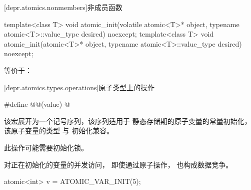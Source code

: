 [depr.atomics.nonmembers]{非成员函数}

%
\begin{itemdecl}
template<class T>
  void atomic_init(volatile atomic<T>* object, typename atomic<T>::value_type desired) noexcept;
template<class T>
  void atomic_init(atomic<T>* object, typename atomic<T>::value_type desired) noexcept;
\end{itemdecl}

\begin{itemdescr}
\pnum
\effects
等价于：
\end{itemdescr}

[depr.atomics.types.operations]{原子类型上的操作}

%
\begin{itemdecl}
#define @@(value) @\seebelow@
\end{itemdecl}

\begin{itemdescr}
\pnum
该宏展开为一个记号序列，该序列适用于
静态存储期的原子变量的常量初始化，该原子变量的类型
与  初始化兼容。
\begin{note}
此操作可能需要初始化锁。
\end{note}
对正在初始化的变量的并发访问，
即使通过原子操作，
也构成数据竞争。
\begin{example}
\begin{codeblock}
atomic<int> v = ATOMIC_VAR_INIT(5);
\end{codeblock}
\end{example}
\end{itemdescr}
